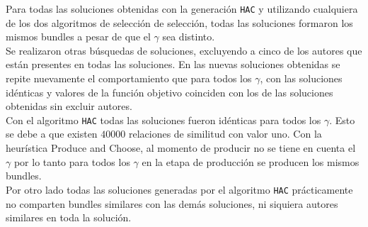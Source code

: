 Para todas las soluciones obtenidas con la generación \texttt{HAC} y utilizando cualquiera de los 
dos algoritmos de selección de selección, todas las soluciones formaron los mismos bundles a 
pesar de que el $\gamma$ sea distinto.\\ 
Se realizaron otras búsquedas de soluciones, excluyendo a cinco de los autores que están presentes 
en todas las soluciones. En las nuevas soluciones obtenidas se repite nuevamente el comportamiento 
que para todos los $\gamma$, con las soluciones idénticas y valores de la función objetivo coinciden 
con los de las soluciones obtenidas sin excluir autores.\\
Con el algoritmo \texttt{HAC} todas las soluciones fueron idénticas para todos los $\gamma$. Esto 
se debe a que existen $40000$ relaciones de similitud con valor uno. Con la heurística Produce and 
Choose, al momento de producir no se tiene en cuenta el $\gamma$ por lo tanto para todos los 
$\gamma$ en la etapa de producción se producen los mismos bundles.\\
Por otro lado todas las soluciones generadas por el algoritmo \texttt{HAC} prácticamente no 
comparten bundles similares con las demás soluciones, ni siquiera autores similares en toda la 
solución.
